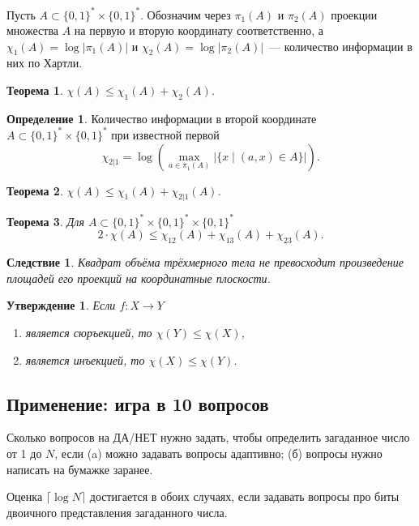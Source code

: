 \documentclass[12pt]{article}
\newcommand{\bits}{\{0,1\}}
\newcommand{\bitstr}{\bits^*}
\theoremstyle{definition}
\newtheorem{definition}{Определение}[section]
\theoremstyle{plain}
\newtheorem{theorem}{Теорема}[section]
\newtheorem{statement}{Утверждение}[section]
\newtheorem{corollary}{Следствие}[section]
\theoremstyle{remark}
\begin{document}
Пусть \(A\subset\bitstr\times\bitstr\). Обозначим через \(\pi_1(A)\) и \(\pi_2(A)\) проекции множества \(A\) на первую и вторую координату соответственно, а \(\chi_1(A) = \log|\pi_1(A)|\) и \(\chi_2(A) = \log|\pi_2(A)|\)~--- количество информации в них по Хартли.

\begin{theorem} 
\(\chi(A) \le \chi_1(A) + \chi_2(A)\).
\end{theorem}

\begin{definition}
Количество информации в второй координате \(A\subset\bitstr\times\bitstr\) при известной первой
\[\chi_{2|1} = \log\left(\max_{a\in\pi_1(A)}\bigl|\{x \mid (a, x)\in A\}\bigr|\right).\]
\end{definition}

\begin{theorem} 
\(\chi(A) \le \chi_1(A) + \chi_{2|1}(A)\).
\end{theorem}

\begin{theorem}\label{thm:volume}
Для \(A\subset\bitstr\times\bitstr\times\bitstr\)
\[2\cdot\chi(A) \le \chi_{12}(A) + \chi_{13}(A) + \chi_{23}(A).\]
\end{theorem}
\begin{corollary}
Квадрат объёма трёхмерного тела не превосходит произведение площадей его проекций на координатные плоскости.
\end{corollary}

\begin{statement}
Если \(f: X\to Y\)
\begin{enumerate}
    \item является сюръекцией, то \(\chi(Y)\le \chi(X)\),
    \item является инъекцией, то \(\chi(X)\le \chi(Y)\).
\end{enumerate}
\end{statement}

\subsection{Применение: игра в 10 вопросов}
Сколько вопросов на ДА/НЕТ нужно задать, чтобы определить загаданное число от 1 до \(N\), если (a) можно задавать вопросы адаптивно; (б) вопросы нужно написать на бумажке заранее.

Оценка \(\lceil\log N\rceil \) достигается в обоих случаях, если задавать вопросы про биты двоичного представления загаданного числа.
\end{document}
